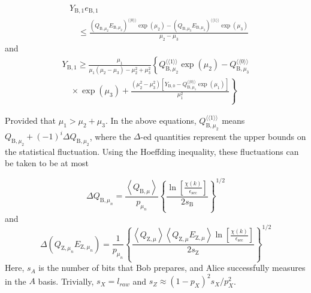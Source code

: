 \documentclass[%
 reprint,
superscriptaddress,
 amsmath,amssymb,
 aps,
]{revtex4-2}
\begin{document}
\begin{equation}
    \begin{aligned}
& Y_{\mathrm{B}, 1} e_{\mathrm{B}, 1} \\
& \quad \leqslant \frac{\left(Q_{\mathrm{B}, \mu_2} E_{\mathrm{B}, \mu_2}\right)^{\langle\langle 0\rangle\rangle} \exp \left(\mu_2\right)-\left(Q_{\mathrm{B}, \mu_3} E_{\mathrm{B}, \mu_3}\right)^{\langle\langle 1\rangle\rangle} \exp \left(\mu_3\right)}{\mu_2-\mu_3}
\end{aligned}
\end{equation}
and
\begin{equation}
    \begin{array}{r}
Y_{\mathrm{B}, 1} \geqslant \frac{\mu_1}{\mu_1\left(\mu_2-\mu_3\right)-\mu_2^2+\mu_3^2}\left\{Q_{\mathrm{B}, \mu_2}^{\langle\langle 1\rangle\rangle} \exp \left(\mu_2\right)-Q_{\mathrm{B}, \mu_3}^{\langle\langle 0\rangle\rangle}\right. \\
\left.\quad \times \exp \left(\mu_3\right)+\frac{\left(\mu_2^2-\mu_3^2\right)\left[Y_{\mathrm{B}, 0}-Q_{\mathrm{B}, \mu_1}^{\langle\langle 0\rangle\rangle} \exp \left(\mu_1\right)\right]}{\mu_1^2}\right\}
\end{array}
\end{equation}

Provided that $\mu_1>\mu_2+\mu_3$. In the above equations, $Q_{\mathrm{B}, \mu_2}^{\langle\langle 1\rangle\rangle}$ means  $Q_{\mathrm{B}, \mu_2}+(-1)^i\Delta Q_{\mathrm{B}, \mu_2}$, where the $\Delta$-ed quantities represent the upper bounds on the statistical fluctuation. Using the Hoeffding inequality, these fluctuations can be taken to be at most

\begin{equation}
    \Delta Q_{\mathrm{B}, \mu_n}=\frac{\left\langle Q_{\mathrm{B}, \mu}\right\rangle}{p_{\mu_n}}\left\{\frac{\ln \left[\frac{\chi(k)}{\epsilon_{\mathrm{sec}}}\right]}{2 s_{\mathrm{B}}}\right\}^{1 / 2}
\end{equation}
and
\begin{equation}
    \Delta\left(Q_{\mathrm{Z}, \mu_n} E_{\mathrm{Z}, \mu_n}\right)=\frac{1}{p_{\mu_n}}\left\{\frac{\left\langle Q_{\mathrm{Z}, \mu}\right\rangle\left\langle Q_{\mathrm{Z}, \mu} E_{\mathrm{Z}, \mu}\right\rangle \ln \left[\frac{\chi(k)}{\epsilon_{\mathrm{sec}}}\right]}{2 s_{\mathrm{Z}}}\right\}^{1 / 2}
\end{equation}
Here, $s_A$ is the number of bits that Bob prepares, and Alice successfully measures in the $A$ basis. Trivially, $s_X=l_{raw}$ and $s_Z\approx(1-p_X)^2s_X/p_X^2$.
\end{document}
